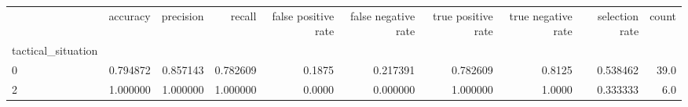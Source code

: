 \begin{tabular}{lrrrrrrrrr}
\toprule
{} &  accuracy &  precision &    recall &  false positive rate &  false negative rate &  true positive rate &  true negative rate &  selection rate &  count \\
tactical\_situation &           &            &           &                      &                      &                     &                     &                 &        \\
\midrule
0                  &  0.794872 &   0.857143 &  0.782609 &               0.1875 &             0.217391 &            0.782609 &              0.8125 &        0.538462 &   39.0 \\
2                  &  1.000000 &   1.000000 &  1.000000 &               0.0000 &             0.000000 &            1.000000 &              1.0000 &        0.333333 &    6.0 \\
\bottomrule
\end{tabular}

